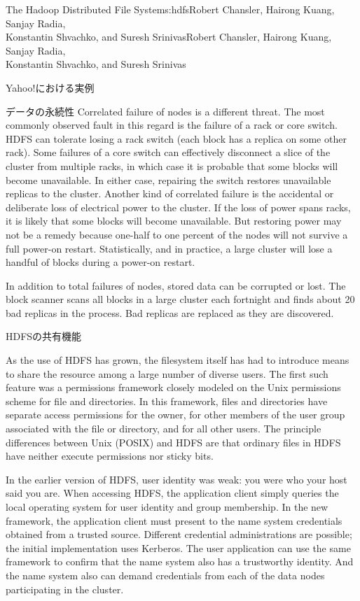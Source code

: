 \begin{aosachaptertoc}{The Hadoop Distributed File System}{s:hdfs}{Robert Chansler, Hairong Kuang, Sanjay Radia, \\ Konstantin Shvachko, and Suresh Srinivas}{Robert Chansler, Hairong Kuang, Sanjay Radia, \\ \hspace*{0.9cm} Konstantin Shvachko, and Suresh Srinivas}
\begin{aosasect1}{Yahoo!における実例}
\begin{aosasect2}{データの永続性}
Correlated failure of nodes is a different threat. The most commonly
observed fault in this regard is the failure of a rack or core switch.
HDFS can tolerate losing a rack switch (each block has a replica on
some other rack). Some failures of a core switch can effectively
disconnect a slice of the cluster from multiple racks, in which case
it is probable that some blocks will become unavailable. In either
case, repairing the switch restores unavailable replicas to the
cluster. Another kind of correlated failure is the accidental or
deliberate loss of electrical power to the cluster. If the loss of
power spans racks, it is likely that some blocks will become
unavailable. But restoring power may not be a remedy because one-half
to one percent of the nodes will not survive a full power-on restart.
Statistically, and in practice, a large cluster will lose a handful of
blocks during a power-on restart.

In addition to total failures of nodes, stored data can be corrupted
or lost. The block scanner scans all blocks in a large cluster each
fortnight and finds about 20 bad replicas in the process. Bad replicas
are replaced as they are discovered.

\end{aosasect2}

\begin{aosasect2}{HDFSの共有機能}

As the use of HDFS has grown, the filesystem itself has had to
introduce means to share the resource among a large number of diverse users. 
The first such feature was a permissions framework closely
modeled on the Unix permissions scheme for file and directories. In
this framework, files and directories have separate access permissions
for the owner, for other members of the user group associated with the
file or directory, and for all other users. The principle differences
between Unix (POSIX) and HDFS are that ordinary files in HDFS have
neither execute permissions nor sticky bits.

In the earlier version of HDFS, user identity was weak: you were who
your host said you are. When accessing HDFS, the application client
simply queries the local operating system for user identity and group
membership. In the new framework, the application client must present
to the name system credentials obtained from a trusted
source. Different credential administrations are possible; the initial
implementation uses Kerberos.  The user application can use the same
framework to confirm that the name system also has a trustworthy
identity. And the name system also can demand credentials from each of
the data nodes participating in the cluster.


\end{aosasect2}
\end{aosasect1}
\end{aosachaptertoc}
